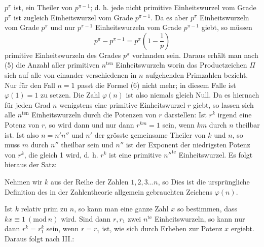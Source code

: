 $p^\pi$ ist, ein Theiler von $p^{\pi-1}$; d. h. jede nicht primitive Einheitswurzel vom Grade $p^\pi$ ist zugleich Einheitswurzel vom Grade $p^{\pi-1}$. Da es aber $p^\pi$ Einheitswurzeln vom Grade $p^\pi$ und nur $p^{\pi-1}$ Einheitswurzeln vom Grade $p^{\pi-1}$ giebt, so müssen
\[
p^\pi - p^{\pi-1} = p^\pi \left(1 - \frac{1}{p}\right)
\]
primitive Einheitswurzeln des Grades $p^\pi$ vorhanden sein. Daraus erhält man nach (5) die Anzahl aller primitiven $n^{\text{ten}}$ Einheitswurzeln
worin das Productzeichen $\Pi$ sich auf alle von einander verschiedenen in $n$ aufgehenden Primzahlen bezieht. Nur für den Fall $n = 1$ passt die Formel (6) nicht mehr; in diesem Falle ist $\varphi(1) = 1$ zu setzen. Die Zahl $\varphi(n)$ ist also niemals gleich Null. Da es hiernach für jeden Grad $n$ wenigstens eine primitive Einheitswurzel $r$ giebt, so lassen sich alle $n^{\text{ten}}$ Einheitswurzeln durch die Potenzen von $r$ darstellen:
Ist $r^k$ irgend eine Potenz von $r$, so wird dann und nur dann $r^{km} = 1$ sein, wenn $km$ durch $n$ theilbar ist. Ist also $n = n'n''$ und $n'$ der grösste gemeinsame Theiler von $k$ und $n$, so muss $m$ durch $n''$ theilbar sein und $n''$ ist der Exponent der niedrigsten Potenz von $r^k$, die gleich 1 wird, d. h. $r^k$ ist eine primitive $n''^{\text{te}}$ Einheitswurzel. Es folgt hieraus der Satz:


Nehmen wir $k$ aus der Reihe der Zahlen $1, 2, 3 \ldots n$, so  Dies ist die ursprüngliche Definition des in der Zahlentheorie allgemein gebrauchten Zeichens $\varphi(n)$.

Ist $k$ relativ prim zu $n$, so kann man eine ganze Zahl $x$ so bestimmen, dass $kx \equiv 1\ (\mathrm{mod}\ n)$ wird. Sind dann $r, r_1$ zwei $n^{\text{te}}$ Einheitswurzeln, so kann nur dann $r^k = r_1^k$ sein, wenn $r = r_1$ ist, wie sich durch Erheben zur Potenz $x$ ergiebt. Daraus folgt nach III.:
